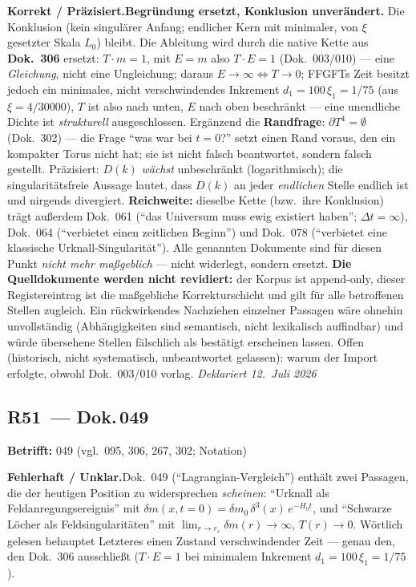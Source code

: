 \smallskip\noindent\textbf{Korrekt / Präzisiert.}\quad \textbf{Begründung ersetzt, Konklusion unverändert.} Die Konklusion (kein singulärer Anfang; endlicher Kern mit minimaler, von $\xi$ gesetzter Skala $L_0$) bleibt. Die Ableitung wird durch die native Kette aus \textbf{Dok.~306} ersetzt: $T\cdot m = 1$, mit $E=m$ also $T\cdot E = 1$ (Dok.~003/010) --- eine \emph{Gleichung}, nicht eine Ungleichung; daraus $E\to\infty \Leftrightarrow T\to 0$; FFGFTs Zeit besitzt jedoch ein minimales, nicht verschwindendes Inkrement $d_1 = 100\,\xi_1 = 1/75$ (aus $\xi=4/30000$), $T$ ist also nach unten, $E$ nach oben beschränkt --- eine unendliche Dichte ist \emph{strukturell} ausgeschlossen. Ergänzend die \textbf{Randfrage}: $\partial T^4=\emptyset$ (Dok.~302) --- die Frage \enquote{was war bei $t=0$?} setzt einen Rand voraus, den ein kompakter Torus nicht hat; sie ist nicht falsch beantwortet, sondern falsch gestellt. Präzisiert: $D(k)$ \emph{wächst} unbeschränkt (logarithmisch); die singularitätsfreie Aussage lautet, dass $D(k)$ an jeder \emph{endlichen} Stelle endlich ist und nirgends divergiert. \textbf{Reichweite:} dieselbe Kette (bzw.\ ihre Konklusion) trägt außerdem Dok.~061 (\enquote{das Universum muss ewig existiert haben}; $\Delta t=\infty$), Dok.~064 (\enquote{verbietet einen zeitlichen Beginn}) und Dok.~078 (\enquote{verbietet eine klassische Urknall-Singularität}). Alle genannten Dokumente sind für diesen Punkt \emph{nicht mehr maßgeblich} --- nicht widerlegt, sondern ersetzt. \textbf{Die Quelldokumente werden nicht revidiert:} der Korpus ist append-only, dieser Registereintrag ist die maßgebliche Korrekturschicht und gilt für alle betroffenen Stellen zugleich. Ein rückwirkendes Nachziehen einzelner Passagen wäre ohnehin unvollständig (Abhängigkeiten sind semantisch, nicht lexikalisch auffindbar) und würde übersehene Stellen fälschlich als bestätigt erscheinen lassen. Offen (historisch, nicht systematisch, unbeantwortet gelassen): warum der Import erfolgte, obwohl Dok.~003/010 vorlag. \emph{Deklariert 12.~Juli 2026}


\medskip


\subsection*{R51~--- Dok.\,049}

\noindent\textbf{Betrifft:} 049 (vgl.\ 095, 306, 267, 302; Notation)


\smallskip\noindent\textbf{Fehlerhaft / Unklar.}\quad Dok.~049 (\enquote{Lagrangian-Vergleich}) enthält zwei Passagen, die der heutigen Position zu widersprechen \emph{scheinen}: \enquote{Urknall als Feldanregungsereignis} mit $\delta m(x,t=0)=\delta m_0\,\delta^3(x)\,e^{-H_0 t}$, und \enquote{Schwarze Löcher als Feldsingularitäten} mit $\lim_{r\to r_s}\delta m(r)\to\infty$, $T(r)\to 0$. Wörtlich gelesen behauptet Letzteres einen Zustand verschwindender Zeit --- genau den, den Dok.~306 ausschließt ($T\cdot E=1$ bei minimalem Inkrement $d_1=100\,\xi_1=1/75$).


